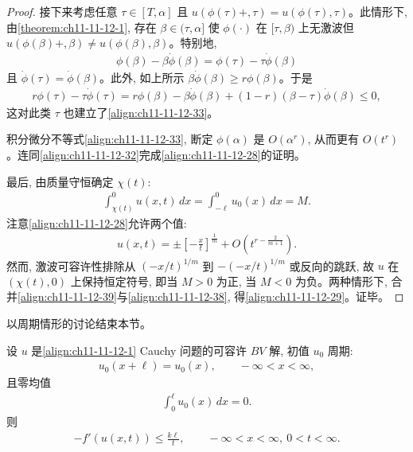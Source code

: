 \documentclass[../../main.tex]{subfiles}
\begin{document}
\begin{proof}
接下来考虑任意 $\tau\in[T,\alpha]$ 且 $u(\phi(\tau)+,\tau)=u(\phi(\tau),\tau)$。此情形下, 由\cref{theorem:ch11-11-12-1}, 存在 $\beta\in(\tau,\alpha]$ 使 $\phi(\cdot)$ 在 $[\tau,\beta)$ 上无激波但 $u(\phi(\beta)+,\beta)\neq u(\phi(\beta),\beta)$。特别地,
\begin{align}
\phi(\beta)-\beta\dot{\phi}(\beta)=\phi(\tau)-\tau\dot{\phi}(\beta)\label{align:ch11-11-12-36}
\end{align}
且 $\dot{\phi}(\tau)=\dot{\phi}(\beta)$。此外, 如上所示 $\beta\dot{\phi}(\beta)\geqslant r\phi(\beta)$。于是
\begin{align}
r\phi(\tau)-\tau\dot{\phi}(\tau)=r\phi(\beta)-\beta\dot{\phi}(\beta)+(1-r)(\beta-\tau)\dot{\phi}(\beta)\leqslant0,\label{align:ch11-11-12-37}
\end{align}
这对此类 $\tau$ 也建立了\eqref{align:ch11-11-12-33}。

积分微分不等式\eqref{align:ch11-11-12-33}, 断定 $\phi(\alpha)$ 是 $O(\alpha^r)$, 从而更有 $O(t^r)$。连同\eqref{align:ch11-11-12-32}完成\eqref{align:ch11-11-12-28}的证明。

最后, 由质量守恒确定 $\chi(t)$:
\begin{align}
\int_{\chi(t)}^0 u(x,t)\,dx=\int_{-\ell}^0 u_0(x)\,dx=M.\label{align:ch11-11-12-38}
\end{align}
注意\eqref{align:ch11-11-12-28}允许两个值:
\begin{align}
u(x,t)=\pm\left[-\frac{x}{t}\right]^{\frac{1}{m}}+O\left(t^{r-\frac{2}{m+1}}\right).\label{align:ch11-11-12-39}
\end{align}
然而, 激波可容许性排除从 $(-x/t)^{1/m}$ 到 $-(-x/t)^{1/m}$ 或反向的跳跃, 故 $u$ 在 $(\chi(t),0)$ 上保持恒定符号, 即当 $M>0$ 为正, 当 $M<0$ 为负。两种情形下, 合并\eqref{align:ch11-11-12-39}与\eqref{align:ch11-11-12-38}, 得\eqref{align:ch11-11-12-29}。证毕。
\end{proof}

以周期情形的讨论结束本节。

\begin{theorem}\label{theorem:ch11-11-12-5}
设 $u$ 是\eqref{align:ch11-11-12-1} Cauchy 问题的可容许 $BV$ 解, 初值 $u_0$ 周期:
\begin{align}
u_0(x+\ell)=u_0(x),\qquad -\infty<x<\infty,\label{align:ch11-11-12-40}
\end{align}
且零均值
\begin{align}
\int_0^\ell u_0(x)\,dx=0.\label{align:ch11-11-12-41}
\end{align}
则
\begin{align}
-f'(u(x,t))\leqslant\frac{k\ell}{t},\qquad -\infty<x<\infty,\ 0<t<\infty.\label{align:ch11-11-12-42}
\end{align}
\end{theorem}
\end{document}
